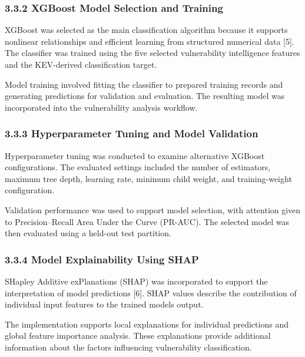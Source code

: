 \documentclass[
]{article}
\begin{document}
\hypertarget{xgboost-model-selection-and-training}{%
\subsubsection{3.3.2 XGBoost Model Selection and
Training}\label{xgboost-model-selection-and-training}}

XGBoost was selected as the main classification algorithm because it
supports nonlinear relationships and efficient learning from structured
numerical data {[}5{]}. The classifier was trained using the five
selected vulnerability intelligence features and the KEV-derived
classification target.

Model training involved fitting the classifier to prepared training
records and generating predictions for validation and evaluation. The
resulting model was incorporated into the vulnerability analysis
workflow.

\hypertarget{hyperparameter-tuning-and-model-validation}{%
\subsubsection{3.3.3 Hyperparameter Tuning and Model
Validation}\label{hyperparameter-tuning-and-model-validation}}

Hyperparameter tuning was conducted to examine alternative XGBoost
configurations. The evaluated settings included the number of
estimators, maximum tree depth, learning rate, minimum child weight, and
training-weight configuration.

Validation performance was used to support model selection, with
attention given to Precision--Recall Area Under the Curve (PR-AUC). The
selected model was then evaluated using a held-out test partition.

\hypertarget{model-explainability-using-shap}{%
\subsubsection{3.3.4 Model Explainability Using
SHAP}\label{model-explainability-using-shap}}

SHapley Additive exPlanations (SHAP) was incorporated to support the
interpretation of model predictions {[}6{]}. SHAP values describe the
contribution of individual input features to the trained
model\textquotesingle s output.

The implementation supports local explanations for individual
predictions and global feature importance analysis. These explanations
provide additional information about the factors influencing
vulnerability classification.
\end{document}
